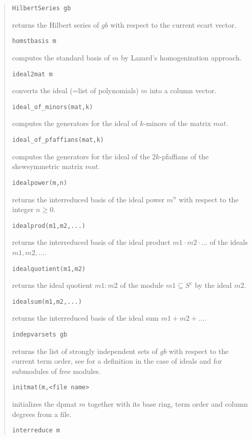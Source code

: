 \documentclass[a4paper,11pt]{article}
\newcommand{\pbx}[1]{\mbox{}\hfill \parbox[t]{12cm}{#1} \pagebreak[3]}
\begin{document}
\begin{quote}
\verb|HilbertSeries gb| 

\pbx{returns the Hilbert series of $gb$ with respect to the current
ecart vector.} 

\verb|homstbasis m| 

\pbx{computes the standard basis of $m$ by Lazard's homogenization
approach.} 

\verb|ideal2mat m| 

\pbx{converts the ideal (=list of polynomials) $m$ into a column
vector.} 

\verb|ideal_of_minors(mat,k)| 

\pbx{computes the generators for the ideal of $k$-minors of the matrix
$mat$.}  

\verb|ideal_of_pfaffians(mat,k)| 

\pbx{computes the generators for the ideal of the $2k$-pfaffians of
the skewsymmetric matrix $mat$.}  

\verb|idealpower(m,n)| 

\pbx{returns the interreduced basis of the ideal power $m^n$ with
respect to the integer $n\geq 0$.}

\verb|idealprod(m1,m2,...)| 

\pbx{returns the interreduced basis of the ideal product 
\mbox{$m1\cdot m2\cdot \ldots$} of the ideals $m1,m2,\ldots$.}

\verb|idealquotient(m1,m2)| 

\pbx{returns the ideal quotient $m1:m2$ of the module $m1\subseteq
S^c$ by the ideal $m2$.}

\verb|idealsum(m1,m2,...)| 

\pbx{returns the interreduced basis of the ideal sum $m1+m2+\ldots$.}

\verb|indepvarsets gb| 

\pbx{returns the list of strongly independent sets of $gb$ with
respect to the current term order, see \cite{KW} for a definition in
the case of ideals and \cite{rois} for submodules of free modules.}

\verb|initmat(m,<file name>| 

\pbx{initializes the dpmat $m$ together with its base ring, term order
and column degrees from a file.}

\verb|interreduce m| 


\end{quote}
\end{document}

